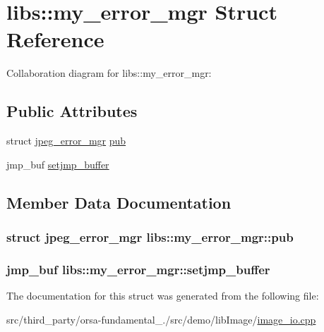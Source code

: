 \hypertarget{structlibs_1_1my__error__mgr}{}\section{libs\+:\+:my\+\_\+error\+\_\+mgr Struct Reference}
\label{structlibs_1_1my__error__mgr}


Collaboration diagram for libs\+:\+:my\+\_\+error\+\_\+mgr\+:
\subsection*{Public Attributes}
\begin{DoxyCompactItemize}
\item 
struct \hyperlink{structjpeg__error__mgr}{jpeg\+\_\+error\+\_\+mgr} \hyperlink{structlibs_1_1my__error__mgr_a52f3084e0b226c932f4f69fb377c4551}{pub}
\item 
jmp\+\_\+buf \hyperlink{structlibs_1_1my__error__mgr_a3bcbb4eb13e78405db937547d53b3ef1}{setjmp\+\_\+buffer}
\end{DoxyCompactItemize}


\subsection{Member Data Documentation}
\hypertarget{structlibs_1_1my__error__mgr_a52f3084e0b226c932f4f69fb377c4551}{}
\subsubsection[{pub}]{\setlength{\rightskip}{0pt plus 5cm}struct {\bf jpeg\+\_\+error\+\_\+mgr} libs\+::my\+\_\+error\+\_\+mgr\+::pub}\label{structlibs_1_1my__error__mgr_a52f3084e0b226c932f4f69fb377c4551}
\hypertarget{structlibs_1_1my__error__mgr_a3bcbb4eb13e78405db937547d53b3ef1}{}
\subsubsection[{setjmp\+\_\+buffer}]{\setlength{\rightskip}{0pt plus 5cm}jmp\+\_\+buf libs\+::my\+\_\+error\+\_\+mgr\+::setjmp\+\_\+buffer}\label{structlibs_1_1my__error__mgr_a3bcbb4eb13e78405db937547d53b3ef1}


The documentation for this struct was generated from the following file\+:\begin{DoxyCompactItemize}
\item 
src/third\+\_\+party/orsa-\/fundamental\+\_./src/demo/lib\+Image/\hyperlink{image__io_8cpp}{image\+\_\+io.\+cpp}\end{DoxyCompactItemize}
